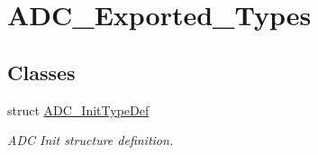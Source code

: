 \hypertarget{group__ADC__Exported__Types}{
\section{ADC\_\-Exported\_\-Types}
\label{group__ADC__Exported__Types}
}
\subsection*{Classes}
\begin{DoxyCompactItemize}
\item 
struct \hyperlink{structADC__InitTypeDef}{ADC\_\-InitTypeDef}
\begin{DoxyCompactList}\small\item\em ADC Init structure definition. \item\end{DoxyCompactList}\end{DoxyCompactItemize}
